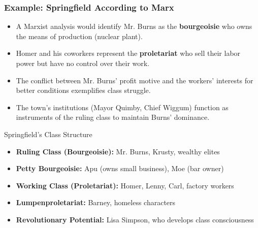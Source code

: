 \documentclass{beamer}
\begin{document}
\begin{frame}
    \frametitle{Example: Springfield According to Marx}
    \begin{itemize}
        \item A Marxist analysis would identify Mr. Burns as the \textbf{bourgeoisie} who owns the means of production (nuclear plant).
        \item Homer and his coworkers represent the \textbf{proletariat} who sell their labor power but have no control over their work.
        \item The conflict between Mr. Burns' profit motive and the workers' interests for better conditions exemplifies class struggle.
        \item The town's institutions (Mayor Quimby, Chief Wiggum) function as instruments of the ruling class to maintain Burns' dominance.
    \end{itemize}
    
    \begin{alertblock}{Springfield's Class Structure}
    \begin{itemize}
        \item \textbf{Ruling Class (Bourgeoisie):} Mr. Burns, Krusty, wealthy elites
        \item \textbf{Petty Bourgeoisie:} Apu (owns small business), Moe (bar owner)
        \item \textbf{Working Class (Proletariat):} Homer, Lenny, Carl, factory workers
        \item \textbf{Lumpenproletariat:} Barney, homeless characters
        \item \textbf{Revolutionary Potential:} Lisa Simpson, who develops class consciousness
    \end{itemize}
    \end{alertblock}
    \end{frame}
\end{document}
